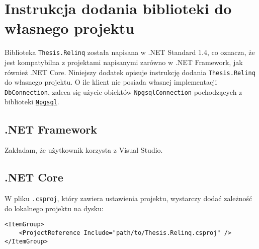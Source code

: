 \chapter{Instrukcja dodania biblioteki do własnego projektu}
Biblioteka \texttt{Thesis.Relinq} została napisana w .NET Standard 1.4, co oznacza, że jest kompatybilna z projektami napisanymi zarówno w .NET Framework, jak również .NET Core. Niniejszy dodatek opisuje instrukcję dodania \texttt{Thesis.Relinq} do własnego projektu. O ile klient nie posiada własnej implementacji \texttt{DbConnection}, zaleca się użycie obiektów \texttt{NpgsqlConnection} pochodzących z biblioteki \href{http://www.npgsql.org/}{\texttt{Npgsql}}.

\section{.NET Framework}
Zakładam, że użytkownik korzysta z Visual Studio. 

\section{.NET Core}
W pliku \texttt{.csproj}, który zawiera ustawienia projektu, wystarczy dodać zależność do lokalnego projektu na dysku:

\begin{lstlisting}
<ItemGroup>
    <ProjectReference Include="path/to/Thesis.Relinq.csproj" />
</ItemGroup>
\end{lstlisting}